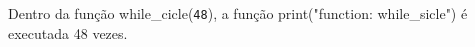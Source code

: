 \documentclass[12pt,varwidth=16cm,border=1pt]{standalone}
\begin{document}
Dentro da função while\_cicle(\verb+48+), a função print("function: while\_sicle") é executada 48 vezes.

\questiomtrue
\end{document}
